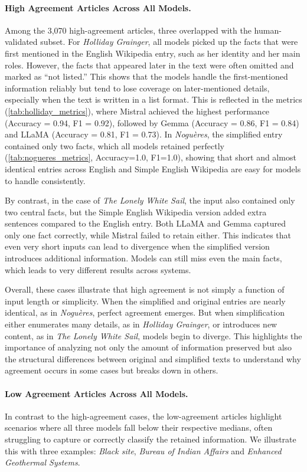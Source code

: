 \documentclass{DESSThesis}
\begin{document}
\paragraph{High Agreement Articles Across All Models.}
Among the 3,070 high-agreement articles, three overlapped with the human-validated subset. 
For \textit{Holliday Grainger}, all models picked up the facts that were first mentioned in the English Wikipedia entry, such as her identity and her main roles. However, the facts that appeared later in the text were often omitted and marked as “not listed.” This shows that the models handle the first-mentioned information reliably but tend to lose coverage on later-mentioned details, especially when the text is written in a list format. This is reflected in the metrics (\autoref{tab:holliday_metrics}), where Mistral achieved the highest performance (Accuracy = 0.94, F1 = 0.92), followed by Gemma (Accuracy = 0.86, F1 = 0.84) and LLaMA (Accuracy = 0.81, F1 = 0.73).
In \textit{Noguères}, the simplified entry contained only two facts, which all models retained perfectly (\autoref{tab:nogueres_metrics}, Accuracy=1.0, F1=1.0), showing that short and almost identical entries across English and Simple English Wikipedia are easy for models to handle consistently.

By contrast, in the case of \textit{The Lonely White Sail}, the input also contained only two central facts, but the Simple English Wikipedia version added extra sentences compared to the English entry. Both LLaMA and Gemma captured only one fact correctly, while Mistral failed to retain either. This indicates that even very short inputs can lead to divergence when the simplified version introduces additional information. Models can still miss even the main facts, which leads to very different results across systems.

Overall, these cases illustrate that high agreement is not simply a function of input length or simplicity. When the simplified and original entries are nearly identical, as in \textit{Noguères}, perfect agreement emerges. But when simplification either enumerates many details, as in \textit{Holliday Grainger}, or introduces new content, as in \textit{The Lonely White Sail}, models begin to diverge. This highlights the importance of analyzing not only the amount of information preserved but also the structural differences between original and simplified texts to understand why agreement occurs in some cases but breaks down in others.

\paragraph{Low Agreement Articles Across All Models.}
In contrast to the high-agreement cases, the low-agreement articles highlight scenarios where all three models fall below their respective medians, often struggling to capture or correctly classify the retained information. 
We illustrate this with three examples: \textit{Black site}, \textit{Bureau of Indian Affairs} and \textit{Enhanced Geothermal Systems}.
\end{document}

